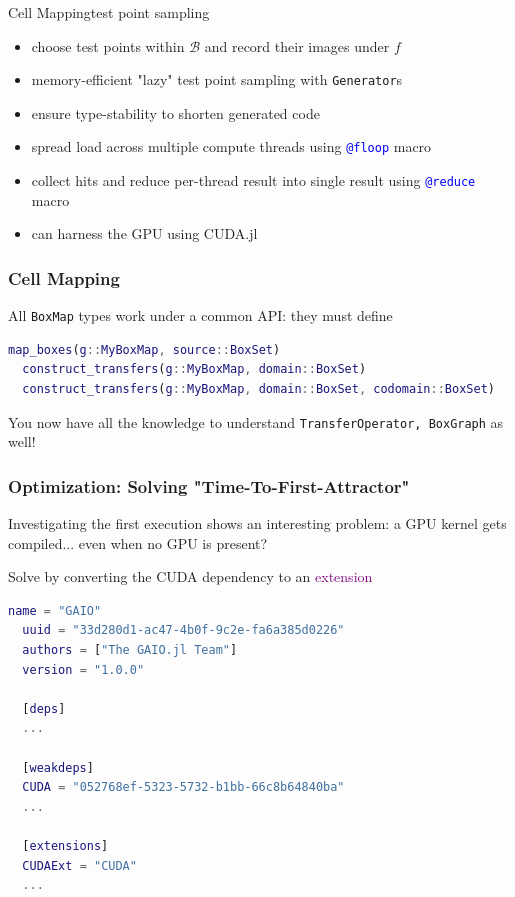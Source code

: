 \documentclass[
  english,            %
  aspectratio=169,    %
]{tumbeamer}
\newcommand{\cB}{\mathcal{B}}
\renewcommand{\emph}[1]{\textcolor{purple}{#1}}
\begin{document}
\begin{frame}{Cell Mapping}{test point sampling}
  
\begin{itemize}
  \item choose test points within $\cB$ and record their images under $f$
  \item memory-efficient "lazy" test point sampling with \texttt{Generator}s
  \item ensure type-stability to shorten generated code
  \item spread load across multiple compute threads using \textcolor{blue}{\texttt{@floop}} macro
  \item collect hits and reduce per-thread result into single result using \textcolor{blue}{\texttt{@reduce}} macro
  \item can harness the GPU using CUDA.jl
\end{itemize}

\end{frame}

\begin{frame}[fragile]
\frametitle{Cell Mapping}

All \texttt{BoxMap} types work under a common API: they must define 

\begin{lstlisting}[language=Matlab,mathescape]
  map_boxes(g::MyBoxMap, source::BoxSet)
  construct_transfers(g::MyBoxMap, domain::BoxSet)
  construct_transfers(g::MyBoxMap, domain::BoxSet, codomain::BoxSet)
\end{lstlisting}

You now have all the knowledge to understand \texttt{TransferOperator, BoxGraph} as well! 
  
\end{frame}

\begin{frame}[fragile]
\frametitle{Optimization: Solving "Time-To-First-Attractor"}
  
Investigating the first execution shows an interesting problem: a GPU kernel gets compiled... even when no GPU is present?

Solve by converting the CUDA dependency to an \emph{extension}

\begin{lstlisting}[language=Matlab,mathescape]
  name = "GAIO"
  uuid = "33d280d1-ac47-4b0f-9c2e-fa6a385d0226"
  authors = ["The GAIO.jl Team"]
  version = "1.0.0"

  [deps]
  ...

  [weakdeps]
  CUDA = "052768ef-5323-5732-b1bb-66c8b64840ba"
  ...

  [extensions]
  CUDAExt = "CUDA"
  ...
\end{lstlisting}

\end{frame}
\end{document}
